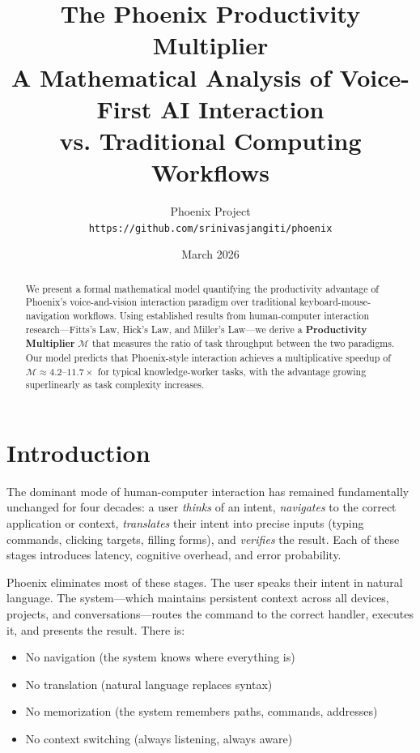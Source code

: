 \documentclass[11pt, a4paper]{article}
\title{
  \textbf{The Phoenix Productivity Multiplier} \\[0.5em]
  \large A Mathematical Analysis of Voice-First AI Interaction \\
  vs. Traditional Computing Workflows
}
\author{
  Phoenix Project \\
  \texttt{https://github.com/srinivasjangiti/phoenix}
}
\date{March 2026}
\begin{document}
\maketitle

\begin{abstract}
We present a formal mathematical model quantifying the productivity advantage
of Phoenix's voice-and-vision interaction paradigm over traditional
keyboard-mouse-navigation workflows. Using established results from
human-computer interaction research---Fitts's Law, Hick's Law, and Miller's
Law---we derive a \textbf{Productivity Multiplier} $\mathcal{M}$ that
measures the ratio of task throughput between the two paradigms. Our model
predicts that Phoenix-style interaction achieves a multiplicative speedup of
$\mathcal{M} \approx 4.2\text{--}11.7\times$ for typical knowledge-worker
tasks, with the advantage growing superlinearly as task complexity increases.
\end{abstract}

\tableofcontents
\newpage

\section{Introduction}

The dominant mode of human-computer interaction has remained fundamentally
unchanged for four decades: a user \emph{thinks} of an intent, \emph{navigates}
to the correct application or context, \emph{translates} their intent into
precise inputs (typing commands, clicking targets, filling forms), and
\emph{verifies} the result. Each of these stages introduces latency, cognitive
overhead, and error probability.

Phoenix eliminates most of these stages. The user speaks their intent in natural
language. The system---which maintains persistent context across all devices,
projects, and conversations---routes the command to the correct handler, executes
it, and presents the result. There is:

\begin{itemize}[noitemsep]
  \item No navigation (the system knows where everything is)
  \item No translation (natural language replaces syntax)
  \item No memorization (the system remembers paths, commands, addresses)
  \item No context switching (always listening, always aware)
\end{itemize}
\end{document}
